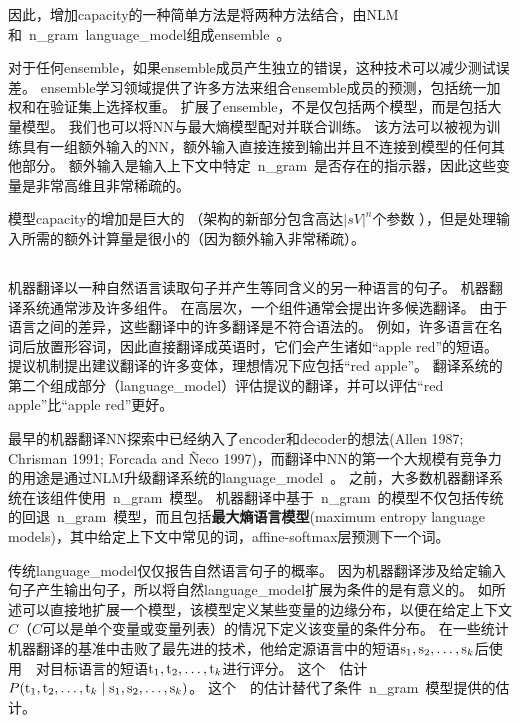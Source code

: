 因此，增加\gls{capacity}的一种简单方法是将两种方法结合，由\gls{NLM}和~\gls{n_gram}~\gls{language_model}组成\gls{ensemble}~\citep{BenDucVin01-small,Bengio-nnlm2003-small}。

对于任何\gls{ensemble}，如果\gls{ensemble}成员产生独立的错误，这种技术可以减少测试误差。
\gls{ensemble}学习领域提供了许多方法来组合\gls{ensemble}成员的预测，包括统一加权和在验证集上选择权重。
\citet{Mikolov-Interspeech-2011} 扩展了\gls{ensemble}，不是仅包括两个模型，而是包括大量模型。
我们也可以将\gls{NN}与最大熵模型配对并联合训练\citep{Mikolov-ASRU-2011}。
该方法可以被视为训练具有一组额外输入的\gls{NN}，额外输入直接连接到输出并且不连接到模型的任何其他部分。
额外输入是输入上下文中特定~\gls{n_gram}~是否存在的指示器，因此这些变量是非常高维且非常稀疏的。

模型\gls{capacity}的增加是巨大的 （架构的新部分包含高达$| sV |^n$个参数 ），但是处理输入所需的额外计算量是很小的（因为额外输入非常稀疏）。

\subsection{}
\label{sec:neural_machine_translation}

机器翻译以一种自然语言读取句子并产生等同含义的另一种语言的句子。
机器翻译系统通常涉及许多组件。
在高层次，一个组件通常会提出许多候选翻译。
由于语言之间的差异，这些翻译中的许多翻译是不符合语法的。
例如，许多语言在名词后放置形容词，因此直接翻译成英语时，它们会产生诸如``apple red''的短语。
提议机制提出建议翻译的许多变体，理想情况下应包括``red apple''。
翻译系统的第二个组成部分（\gls{language_model}）评估提议的翻译，并可以评估``red apple''比``apple red''更好。


最早的机器翻译\gls{NN}探索中已经纳入了\gls{encoder}和\gls{decoder}的想法(Allen 1987; Chrisman 1991; Forcada
and Ñeco 1997)，而翻译中\gls{NN}的第一个大规模有竞争力的用途是通过\gls{NLM}升级翻译系统的\gls{language_model}~\citep{Schwenk-et-al-IWSLT2006,Schwenk-2010}。
之前，大多数机器翻译系统在该组件使用~\gls{n_gram}~模型。
机器翻译中基于~\gls{n_gram}~的模型不仅包括传统的回退~\gls{n_gram}~模型，而且包括\textbf{最大熵语言模型}(maximum entropy language models)，其中给定上下文中常见的词，affine-softmax层预测下一个词。

传统\gls{language_model}仅仅报告自然语言句子的概率。
因为机器翻译涉及给定输入句子产生输出句子，所以将自然\gls{language_model}扩展为条件的是有意义的。
如所述可以直接地扩展一个模型，该模型定义某些变量的边缘分布，以便在给定上下文$C$（$C$可以是单个变量或变量列表）的情况下定义该变量的条件分布。
\citet{Devlin-et-al-ACL2014}在一些统计机器翻译的基准中击败了最先进的技术，他给定源语言中的短语$\mathrm{s}_1, \mathrm{s}_2,\ldots, \mathrm{s}_k$后使用~~对目标语言的短语$\mathrm{t}_1, \mathrm{t}_2,\ldots, \mathrm{t}_k$进行评分。
这个~~估计$P(\mathrm{t}_1, \mathrm{t}_2,\ldots, \mathrm{t}_k \mid \mathrm{s}_1, \mathrm{s}_2,\ldots, \mathrm{s}_k)$。
这个~~的估计替代了条件~\gls{n_gram}~模型提供的估计。

